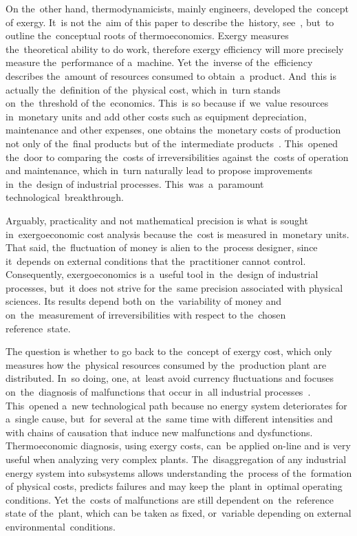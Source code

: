 \documentclass[energies,article,accept,moreauthors,pdftex]{Definitions/mdpi}
\begin{document}
On the~other hand, thermodynamicists, mainly engineers, developed the~concept of exergy. It~is not the~aim of this paper to describe the~history, see~\cite{Sciubba2007}, but~to outline the~conceptual roots of thermoeconomics. Exergy measures the~theoretical ability to do work, therefore exergy efficiency will more precisely measure the~performance of a~machine. Yet the~inverse of the~efficiency describes the~amount of resources consumed to obtain~a~product. And~this is actually the~definition of the~physical cost, which in~turn stands on~the~threshold of the~economics. This~is so because if~we~value resources in~monetary units and add other costs such as equipment depreciation, maintenance and other expenses, one obtains the~monetary costs of production not only of the~final products but of the~intermediate products~\cite{Tribus1962,ElSayed1970a, Tsatsaronis1985b}. This~opened the~door to comparing the~costs of irreversibilities against the~costs of operation and maintenance, which in~turn naturally lead to propose improvements in~the~design of industrial processes. This~was~a~paramount technological~breakthrough.

Arguably, practicality and not mathematical precision is what is sought in~exergoeconomic cost analysis because the~cost is measured in~monetary units. That said, the~fluctuation of money is alien to the~process designer, since it~depends on external conditions that the~practitioner cannot control. Consequently, exergoeconomics is a~useful tool in~the~design of industrial processes, but~it does not strive for the~same precision associated with physical sciences. Its results depend both on~the~variability of money and on~the~measurement of irreversibilities with respect to the~chosen reference~state.

The question is whether to go back to the~concept of exergy cost, which only measures how the~physical resources consumed by the~production plant are distributed. In~so doing, one, at~least avoid currency fluctuations and focuses on~the~diagnosis of malfunctions that occur in~all industrial processes~\cite{Valero2004}. This~opened a~new technological path because no energy system deteriorates for a~single cause, but~for several at the~same time with different intensities and with chains of causation that induce new malfunctions and dysfunctions. Thermoeconomic diagnosis, using exergy costs, can~be applied on-line and is very useful when analyzing very complex plants. The~disaggregation of any industrial energy system into subsystems allows understanding the~process of the~formation of physical costs, predicts failures and may keep the~plant in~optimal operating conditions. Yet the~costs of malfunctions are still dependent on~the~reference state of the~plant, which can be taken as fixed, or~variable depending on external environmental~conditions.
\end{document}
